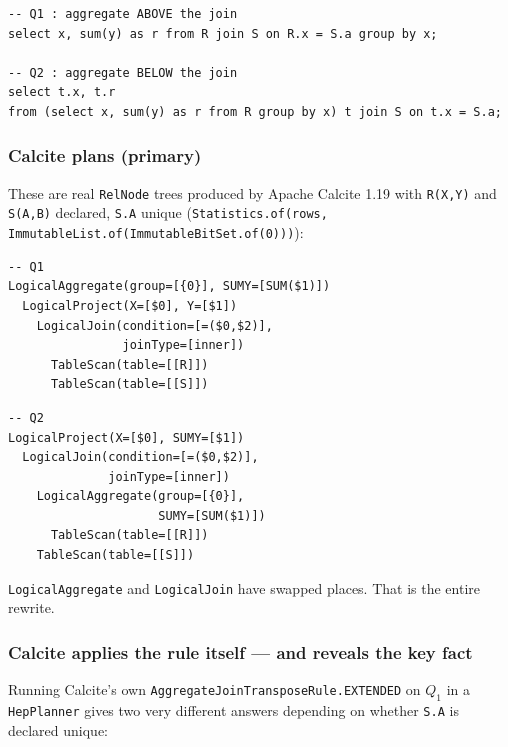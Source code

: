 \begin{lstlisting}[style=sql]
-- Q1 : aggregate ABOVE the join
select x, sum(y) as r from R join S on R.x = S.a group by x;

-- Q2 : aggregate BELOW the join
select t.x, t.r
from (select x, sum(y) as r from R group by x) t join S on t.x = S.a;
\end{lstlisting}

\subsubsection{Calcite plans (primary)}

These are real \texttt{RelNode} trees produced by Apache Calcite 1.19 with
\texttt{R(X,Y)} and \texttt{S(A,B)} declared, \texttt{S.A} unique
(\lstinline[style=pseudo]|Statistics.of(rows, ImmutableList.of(ImmutableBitSet.of(0)))|):

\begin{center}
\begin{minipage}{0.48\linewidth}
\begin{lstlisting}[style=plan]
-- Q1
LogicalAggregate(group=[{0}], SUMY=[SUM($1)])
  LogicalProject(X=[$0], Y=[$1])
    LogicalJoin(condition=[=($0,$2)],
                joinType=[inner])
      TableScan(table=[[R]])
      TableScan(table=[[S]])
\end{lstlisting}
\end{minipage}\hfill
\begin{minipage}{0.48\linewidth}
\begin{lstlisting}[style=plan]
-- Q2
LogicalProject(X=[$0], SUMY=[$1])
  LogicalJoin(condition=[=($0,$2)],
              joinType=[inner])
    LogicalAggregate(group=[{0}],
                     SUMY=[SUM($1)])
      TableScan(table=[[R]])
    TableScan(table=[[S]])
\end{lstlisting}
\end{minipage}
\end{center}

\noindent \texttt{LogicalAggregate} and \texttt{LogicalJoin} have swapped places. That is
the entire rewrite.

\subsubsection{Calcite applies the rule itself --- and reveals the key fact}
\label{sec:calcite-fires}

Running Calcite's own \texttt{AggregateJoinTransposeRule.EXTENDED} on $Q_1$ in a
\texttt{HepPlanner} gives two very different answers depending on whether \texttt{S.A} is
declared unique:

